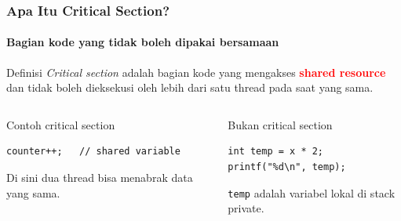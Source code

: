 \documentclass[t,aspectratio=169,xcolor=dvipsnames]{beamer}
\newcommand{\tem}[1]{\textbf{\textcolor{red}{#1}}}
\begin{document}
\begin{frame}[fragile]
    \frametitle{Apa Itu Critical Section?}
    \framesubtitle{Bagian kode yang tidak boleh dipakai bersamaan}
    \small

    \begin{block}{Definisi}
        \textit{Critical section} adalah bagian kode yang mengakses \tem{shared resource} dan tidak boleh dieksekusi oleh lebih dari satu thread pada saat yang sama.
    \end{block}

    \vspace{0.2cm}
    \begin{columns}[T]
        \begin{alertblock}{Contoh critical section}
\begin{lstlisting}[basicstyle=\ttfamily\scriptsize]
counter++;   // shared variable
\end{lstlisting}
            Di sini dua thread bisa menabrak data yang sama.
        \end{alertblock}

        \begin{exampleblock}{Bukan critical section}
\begin{lstlisting}[basicstyle=\ttfamily\scriptsize]
int temp = x * 2;
printf("%d\n", temp);
\end{lstlisting}
            \texttt{temp} adalah variabel lokal di stack private.
        \end{exampleblock}
    \end{columns}
\end{frame}
\end{document}
